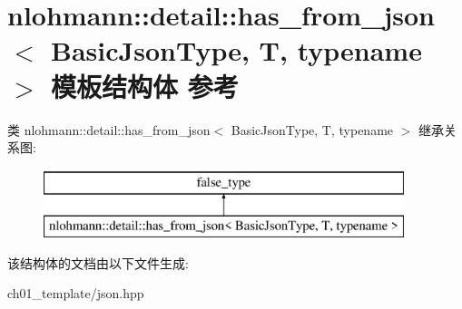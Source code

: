 \hypertarget{structnlohmann_1_1detail_1_1has__from__json}{}\section{nlohmann\+::detail\+::has\+\_\+from\+\_\+json$<$ Basic\+Json\+Type, T, typename $>$ 模板结构体 参考}
\label{structnlohmann_1_1detail_1_1has__from__json}
类 nlohmann\+::detail\+::has\+\_\+from\+\_\+json$<$ Basic\+Json\+Type, T, typename $>$ 继承关系图\+:\begin{figure}[H]
\begin{center}
\leavevmode
\includegraphics[height=2.000000cm]{structnlohmann_1_1detail_1_1has__from__json}
\end{center}
\end{figure}


该结构体的文档由以下文件生成\+:\begin{DoxyCompactItemize}
\item 
ch01\+\_\+template/json.\+hpp\end{DoxyCompactItemize}
